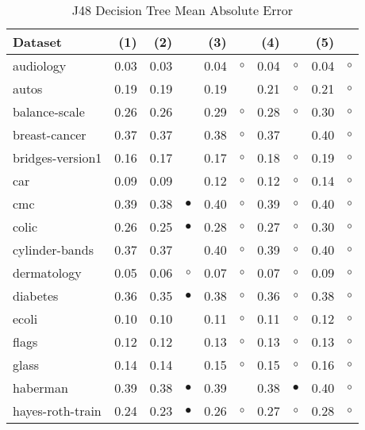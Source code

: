 \newpage
{\centering \footnotesize \begin{longtable}{lrr@{\hspace{0.1cm}}cr@{\hspace{0.1cm}}cr@{\hspace{0.1cm}}cr@{\hspace{0.1cm}}c}
\caption{\label{j48mae}J48 Decision Tree Mean Absolute Error}
\\
\hline
Dataset & (1)& (2) & & (3) & & (4) & & (5) & \\
\hline
audiology & 0.03 & 0.03 &           & 0.04 &   $\circ$ & 0.04 &   $\circ$ & 0.04 &  $\circ$\\
autos & 0.19 & 0.19 &           & 0.19 &           & 0.21 &   $\circ$ & 0.21 &  $\circ$\\
balance-scale & 0.26 & 0.26 &           & 0.29 &   $\circ$ & 0.28 &   $\circ$ & 0.30 &  $\circ$\\
breast-cancer & 0.37 & 0.37 &           & 0.38 &   $\circ$ & 0.37 &           & 0.40 &  $\circ$\\
bridges-version1 & 0.16 & 0.17 &           & 0.17 &   $\circ$ & 0.18 &   $\circ$ & 0.19 &  $\circ$\\
car & 0.09 & 0.09 &           & 0.12 &   $\circ$ & 0.12 &   $\circ$ & 0.14 &  $\circ$\\
cmc & 0.39 & 0.38 & $\bullet$ & 0.40 &   $\circ$ & 0.39 &   $\circ$ & 0.40 &  $\circ$\\
colic & 0.26 & 0.25 & $\bullet$ & 0.28 &   $\circ$ & 0.27 &   $\circ$ & 0.30 &  $\circ$\\
cylinder-bands & 0.37 & 0.37 &           & 0.40 &   $\circ$ & 0.39 &   $\circ$ & 0.40 &  $\circ$\\
dermatology & 0.05 & 0.06 &   $\circ$ & 0.07 &   $\circ$ & 0.07 &   $\circ$ & 0.09 &  $\circ$\\
diabetes & 0.36 & 0.35 & $\bullet$ & 0.38 &   $\circ$ & 0.36 &   $\circ$ & 0.38 &  $\circ$\\
ecoli & 0.10 & 0.10 &           & 0.11 &   $\circ$ & 0.11 &   $\circ$ & 0.12 &  $\circ$\\
flags & 0.12 & 0.12 &           & 0.13 &   $\circ$ & 0.13 &   $\circ$ & 0.13 &  $\circ$\\
glass & 0.14 & 0.14 &           & 0.15 &   $\circ$ & 0.15 &   $\circ$ & 0.16 &  $\circ$\\
haberman & 0.39 & 0.38 & $\bullet$ & 0.39 &           & 0.38 & $\bullet$ & 0.40 &  $\circ$\\
hayes-roth-train & 0.24 & 0.23 & $\bullet$ & 0.26 &   $\circ$ & 0.27 &   $\circ$ & 0.28 &  $\circ$\\

\end{longtable}}
